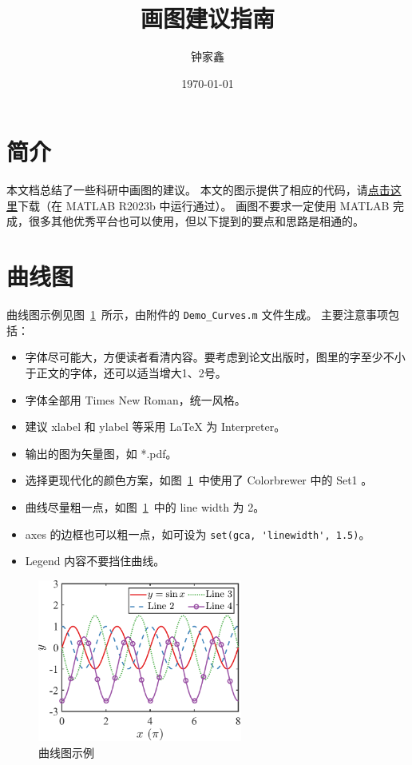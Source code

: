 \documentclass{article}
\title{\textbf{画图建议指南}}
\author{钟家鑫}
\date{\today}
\begin{document}
\maketitle

\section{简介}
本文档总结了一些科研中画图的建议。
本文的图示提供了相应的代码，请\href{https://github.com/JiaxinZhong/JiaxinZhong.github.io/raw/master/tutorial/plot/plot.zip}{点击这里}下载（在 MATLAB R2023b 中运行通过）。
画图不要求一定使用 MATLAB 完成，很多其他优秀平台也可以使用，但以下提到的要点和思路是相通的。

\section{曲线图}
\label{sec:curves}

曲线图示例见图~\ref{fig:curves}~所示，由附件的 \lstinline!Demo_Curves.m! 文件生成。
主要注意事项包括：
\begin{itemize}
    \item 字体尽可能大，方便读者看清内容。要考虑到论文出版时，图里的字至少不小于正文的字体，还可以适当增大1、2号。
    \item 字体全部用 Times New Roman，统一风格。
    \item 建议 xlabel 和 ylabel 等采用 LaTeX 为 Interpreter。
    \item 输出的图为矢量图，如 *.pdf。
    \item 选择更现代化的颜色方案，如图~\ref{fig:curves}~中使用了 Colorbrewer 中的 Set1 \cite{Brewer2024ColorBrewerColorAdvice}。
    \item 曲线尽量粗一点，如图~\ref{fig:curves}~中的 line width 为 2。
    \item axes 的边框也可以粗一点，如可设为 \lstinline!set(gca, 'linewidth', 1.5)!。
    \item Legend 内容不要挡住曲线。
\end{itemize}

\begin{figure}[!htb]
    \centering
    \includegraphics[width = 0.6\textwidth]{Demo_Curves}
    \caption{曲线图示例}
    \label{fig:curves}
\end{figure}
\end{document}
